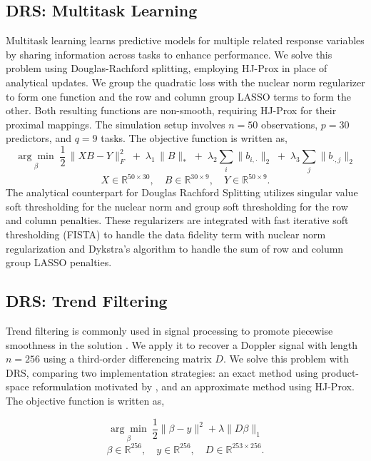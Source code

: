 \documentclass{article}
\theoremstyle{plain}
\theoremstyle{definition}
\theoremstyle{remark}
\begin{document}
\subsection{DRS: Multitask Learning}
Multitask learning learns predictive models for multiple related response variables by sharing information across tasks to enhance performance. We solve this problem using Douglas-Rachford splitting, employing HJ-Prox in place of analytical updates.
We group the quadratic loss with the nuclear norm regularizer to form one function and the row and column group LASSO terms to form the other. Both resulting functions are non-smooth, requiring HJ-Prox for their proximal mappings. The simulation setup involves $n=50$ observations, $p=30$ predictors, and $q=9$ tasks. The objective function is written as, 
\begin{equation}
\underset{\beta}{\arg\min}\;
\frac{1}{2}\,\| X B-Y\|_{F}^{2}
\;+\;\lambda_{1}\,\| B\|_{*}
\;+\;\lambda_{2}\sum_{i}\| b_{i,\cdot}\|_{2}
\;+\;\lambda_{3}\sum_{j}\|b_{\cdot,j}\|_{2}
\end{equation}
\[
X\in\mathbb{R}^{50\times 30},\quad
B\in\mathbb{R}^{30\times 9},\quad
Y\in\mathbb{R}^{50\times 9}.
\]
The analytical counterpart for Douglas Rachford Splitting utilizes singular value soft thresholding for the nuclear norm and group soft thresholding for the row and column penalties. These regularizers are integrated with fast iterative soft thresholding (FISTA) to handle the data fidelity term with nuclear norm regularization and Dykstra's algorithm to handle the sum of row and column group LASSO penalties.

\subsection{DRS: Trend Filtering}
Trend filtering is commonly used in signal processing to promote piecewise smoothness in the solution \cite{tibshirani2014adaptive}. We apply it to recover a Doppler signal with length $n=256$ using a third-order differencing matrix $D$. We solve this problem with DRS, comparing two implementation strategies: an exact method using product-space reformulation motivated by \cite{TibshiraniTaylor2011}, and an approximate method using HJ-Prox. The objective function is written as, 

\begin{equation}
    \underset{\beta}{\arg\min}\ \frac{1}{2}\|\beta - y\|^2 + \lambda\|D\beta\|_1
\end{equation}
\[
\beta \in\mathbb{R}^{256},\quad
y\in\mathbb{R}^{256},\quad
D \in\mathbb{R}^{253\times 256}.
\]
\end{document}
